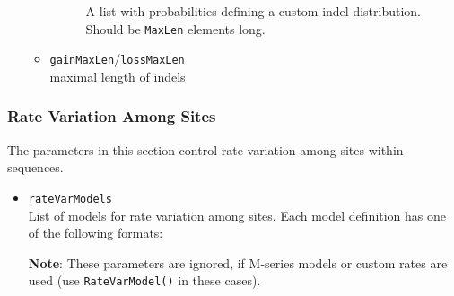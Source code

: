 \documentclass[11pt]{article}
\begin{document}
\begin{itemize}
\begin{itemize}
\begin{description}
A list with probabilities defining a custom indel distribution. Should be \texttt{MaxLen} elements long.
\end{description}

\item{\texttt{gainMaxLen}/\texttt{lossMaxLen}} \hfill \\
maximal length of indels
\end{itemize}
\end{itemize}

\subsubsection{Rate Variation Among Sites}
The parameters in this section control rate variation among sites within sequences.
\begin{itemize}
\item{\texttt{rateVarModels}} \hfill \\
List of models for rate variation among sites. Each model definition has one of the following formats:

\noindent \textbf{Note}: These parameters are ignored, if M-series models or custom rates are used (use \texttt{RateVarModel()} in these cases).


\end{itemize}
\end{document}
